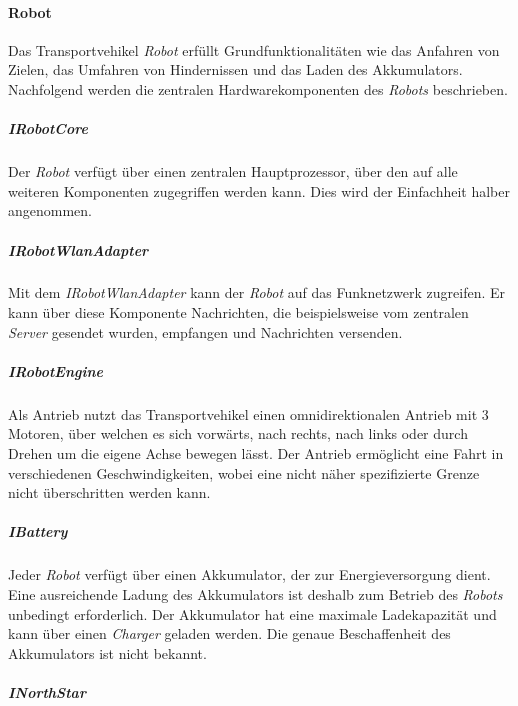     \paragraph{Robot}\label{robot} \newline

    Das Transportvehikel \emph{Robot} erfüllt Grundfunktionalitäten wie das
    Anfahren von Zielen, das Umfahren von Hindernissen und das Laden des
    Akkumulators. Nachfolgend werden die zentralen Hardwarekomponenten des
    \emph{Robots} beschrieben.

    \subparagraph{IRobotCore}\label{irobotcore} \newline

    Der \emph{Robot} verfügt über einen zentralen Hauptprozessor, über den
    auf alle weiteren Komponenten zugegriffen werden kann. Dies wird der
    Einfachheit halber angenommen.

    \subparagraph{IRobotWlanAdapter}\label{irobotwlanadapter} \newline

    Mit dem \emph{IRobotWlanAdapter} kann der \emph{Robot} auf das Funknetzwerk
    zugreifen. Er kann über diese Komponente Nachrichten, die beispielsweise vom
    zentralen \emph{Server} gesendet wurden, empfangen und Nachrichten versenden.

    \subparagraph{IRobotEngine}\label{irobotengine} \newline

    Als Antrieb nutzt das Transportvehikel einen omnidirektionalen Antrieb
    mit 3 Motoren, über welchen es sich vorwärts, nach rechts, nach links
    oder durch Drehen um die eigene Achse bewegen lässt. Der Antrieb
    ermöglicht eine Fahrt in verschiedenen Geschwindigkeiten, wobei eine
    nicht näher spezifizierte Grenze nicht überschritten werden kann.

    \subparagraph{IBattery}\label{ibattery} \newline

    Jeder \emph{Robot} verfügt über einen Akkumulator, der zur
    Energieversorgung dient. Eine ausreichende Ladung des Akkumulators ist
    deshalb zum Betrieb des \emph{Robots} unbedingt erforderlich. Der
    Akkumulator hat eine maximale Ladekapazität und kann über einen
    \emph{Charger} geladen werden. Die genaue Beschaffenheit des
    Akkumulators ist nicht bekannt.

    \subparagraph{INorthStar}\label{inorthstar} \newline

